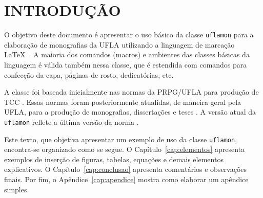 \chapter{INTRODUÇÃO}

O objetivo deste documento é apresentar o uso básico da classe {\tt uflamon} para a elaboração de monografias da UFLA utilizando a linguagem de marcação \LaTeX\ \cite{Lamport1994}.  A maioria dos comandos (macros) e ambientes das classes básicas da linguagem é válida também nessa classe, que é estendida com comandos para confecção da capa, páginas de rosto, dedicatórias, etc.

A classe foi baseada inicialmente nas normas da PRPG/UFLA para produção de TCC \cite{PRPG2006}. Essas normas foram posteriormente atualidas, de maneira geral pela UFLA, para a produção de monografias, dissertações e teses \cite{BIB2010}.  A versão atual da {\tt uflamon} reflete a última versão da norma \cite{UFLA:2015}.

Este texto, que objetiva apresentar um exemplo de uso da classe  {\tt uflamon}, encontra-se organizado como se segue. O Capítulo~\ref{cap:elementos} apresenta exemplos de inserção de figuras, tabelas, equações e demais elementos explicativos. O Capítulo~\ref{cap:conclusao} apresenta comentários e observações finais. Por fim, o Apêndice~\ref{cap:apendice} mostra como elaborar um apêndice simples.